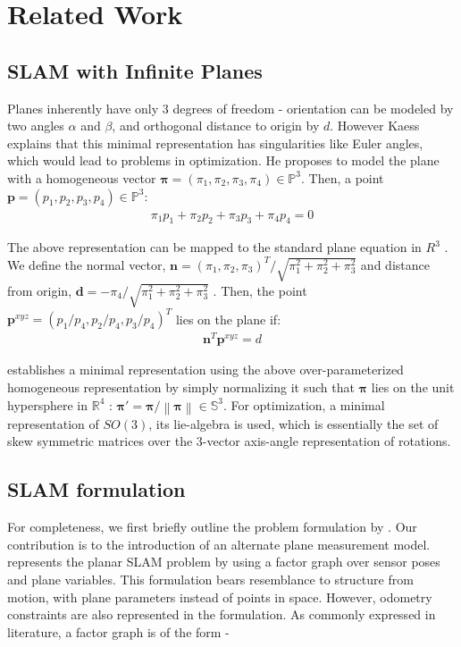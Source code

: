 \documentclass[12pt]{article}
\begin{document}
\section*{Related Work}
\subsection*{SLAM with Infinite Planes}
Planes inherently have only 3 degrees of freedom - orientation can be modeled by two angles $\alpha$ and $\beta$, and orthogonal distance to origin by $d$. 
However Kaess \cite{kaess2015simultaneous} explains that this minimal representation has singularities like Euler angles, which would lead to problems in optimization.
He proposes to model the plane with a homogeneous vector $\boldsymbol{\pi} = (\pi_1, \pi_2, \pi_3, \pi_4) \in \mathbb{P}^3$. 
Then, a point $\boldsymbol{p} = (p_1, p_2, p_3, p_4) \in \mathbb{P}^3$:
\begin{align*}
	\pi_1 p_1 + \pi_2 p_2 + \pi_3 p_3 + \pi_4 p_4 = 0
\end{align*}

The above representation can be mapped to the standard plane equation in $R^3$ \cite{kaess2015simultaneous}. We define the normal vector, $\boldsymbol{n} = (\pi_1, \pi_2, \pi_3)^T / \sqrt{\pi_1^2+\pi_2^2+\pi_3^2}$ and distance from origin, $\boldsymbol{d} = - \pi_4 / \sqrt{\pi_1^2+\pi_2^2+\pi_3^2}$ . Then, the point $\boldsymbol p^{xyz} = (p_1/p_4, p_2/p_4, p_3/p_4)^T$ lies on the plane if:
\begin{align*}
	\boldsymbol{n}^T \boldsymbol{p}^{xyz} = d
\end{align*}

\cite{kaess2015simultaneous} establishes a minimal representation using the above over-parameterized homogeneous representation by simply normalizing it such that $\boldsymbol{\pi}$ lies on the unit hypersphere in $\mathbb{R}^4$ : $\boldsymbol{\pi'} = \boldsymbol{\pi} /\left \| \boldsymbol{\pi} \right \| \in \mathbb{S}^3$.
For optimization, a minimal representation of $SO(3)$, its lie-algebra is used, which is essentially the set of skew symmetric matrices over the 3-vector axis-angle representation of rotations. 

\subsection*{SLAM formulation}
For completeness, we first briefly outline the problem formulation by \cite{kaess2015simultaneous}. 
Our contribution is to the introduction of an alternate plane measurement model. \cite{kaess2015simultaneous} represents the planar SLAM problem by using a factor graph over sensor poses and plane variables. This formulation bears resemblance to structure from motion, with plane parameters instead of points in space. However, odometry constraints are also represented in the formulation. As commonly expressed in literature, a factor graph is of the form - 
\end{document}
